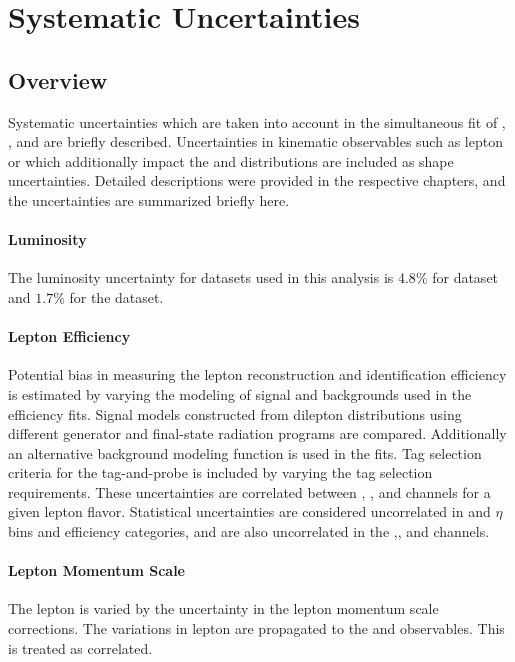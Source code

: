 \chapter{Systematic Uncertainties}\label{ch:systematics}

\section{Overview}
Systematic uncertainties which are taken into account in the simultaneous fit of \Wp, \Wm, and \Z are briefly described. Uncertainties in kinematic observables such as lepton \pt or \met which additionally impact the \mt and \mll distributions are included as shape uncertainties. Detailed descriptions were provided in the respective chapters, and the uncertainties are summarized briefly here.

\subsubsection{Luminosity}
The luminosity uncertainty for datasets used in this analysis is $4.8\%$ for \sg dataset and $1.7\%$ for the \sh dataset. 

\subsubsection{Lepton Efficiency}
Potential bias in measuring the lepton reconstruction and identification efficiency is estimated by varying the modeling of signal and backgrounds used in the efficiency  fits. Signal models constructed from dilepton \mll distributions using different generator and final-state radiation programs are compared. Additionally an alternative background modeling function is used in the fits. Tag selection criteria for the tag-and-probe is included by varying the tag selection requirements. These uncertainties are correlated between \Wp, \Wm, and \Z channels for a given lepton flavor. Statistical uncertainties are considered uncorrelated in \pt and $\eta$ bins and efficiency categories, and are also uncorrelated in the \Wp,\Wm, and \Z channels.

\subsubsection{Lepton Momentum Scale}
The lepton \pt is varied by the uncertainty in the lepton momentum scale corrections. The variations in lepton \pt are propagated to the \mt and \mll observables. This is treated as correlated.

